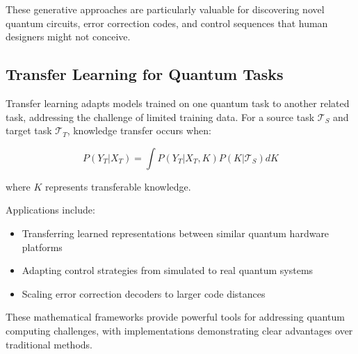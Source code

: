 These generative approaches are particularly valuable for discovering novel quantum circuits, error correction codes, and control sequences that human designers might not conceive.

\subsection{Transfer Learning for Quantum Tasks}
Transfer learning adapts models trained on one quantum task to another related task, addressing the challenge of limited training data. For a source task $\mathcal{T}_S$ and target task $\mathcal{T}_T$, knowledge transfer occurs when:

\begin{equation}
P(Y_T | X_T) = \int P(Y_T | X_T, K) P(K | \mathcal{T}_S) dK
\end{equation}

where $K$ represents transferable knowledge.

Applications include:
\begin{itemize}
    \item Transferring learned representations between similar quantum hardware platforms
    \item Adapting control strategies from simulated to real quantum systems
    \item Scaling error correction decoders to larger code distances
\end{itemize}

These mathematical frameworks provide powerful tools for addressing quantum computing challenges, with implementations demonstrating clear advantages over traditional methods. 